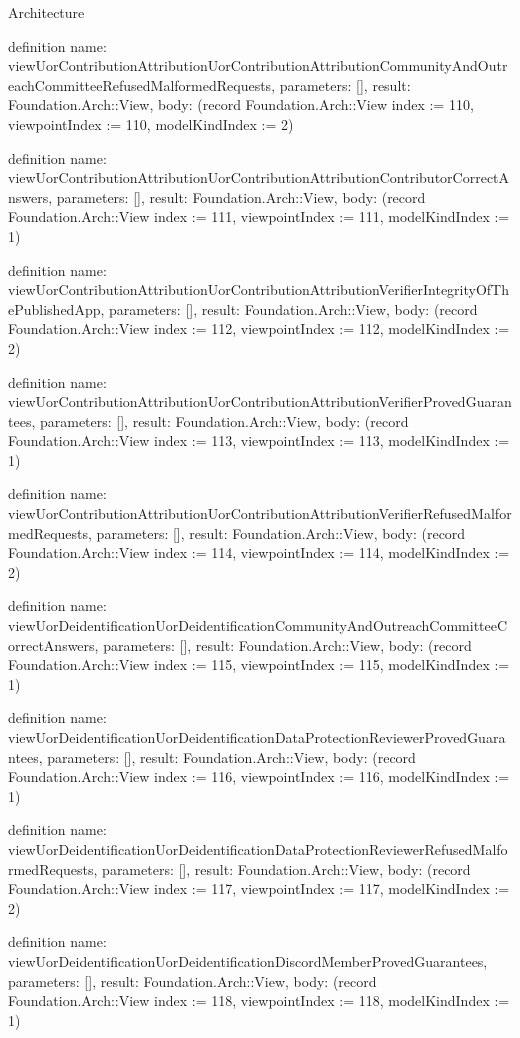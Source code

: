 \begin{lexlean}{Architecture}
\begin{semanticmodule}
definition{
  name: viewUorContributionAttributionUorContributionAttributionCommunityAndOutreachCommitteeRefusedMalformedRequests,
  parameters: [],
  result: Foundation.Arch::View,
  body: (record Foundation.Arch::View {index := 110, viewpointIndex := 110, modelKindIndex := 2})
}

definition{
  name: viewUorContributionAttributionUorContributionAttributionContributorCorrectAnswers,
  parameters: [],
  result: Foundation.Arch::View,
  body: (record Foundation.Arch::View {index := 111, viewpointIndex := 111, modelKindIndex := 1})
}

definition{
  name: viewUorContributionAttributionUorContributionAttributionVerifierIntegrityOfThePublishedApp,
  parameters: [],
  result: Foundation.Arch::View,
  body: (record Foundation.Arch::View {index := 112, viewpointIndex := 112, modelKindIndex := 2})
}

definition{
  name: viewUorContributionAttributionUorContributionAttributionVerifierProvedGuarantees,
  parameters: [],
  result: Foundation.Arch::View,
  body: (record Foundation.Arch::View {index := 113, viewpointIndex := 113, modelKindIndex := 1})
}

definition{
  name: viewUorContributionAttributionUorContributionAttributionVerifierRefusedMalformedRequests,
  parameters: [],
  result: Foundation.Arch::View,
  body: (record Foundation.Arch::View {index := 114, viewpointIndex := 114, modelKindIndex := 2})
}

definition{
  name: viewUorDeidentificationUorDeidentificationCommunityAndOutreachCommitteeCorrectAnswers,
  parameters: [],
  result: Foundation.Arch::View,
  body: (record Foundation.Arch::View {index := 115, viewpointIndex := 115, modelKindIndex := 1})
}

definition{
  name: viewUorDeidentificationUorDeidentificationDataProtectionReviewerProvedGuarantees,
  parameters: [],
  result: Foundation.Arch::View,
  body: (record Foundation.Arch::View {index := 116, viewpointIndex := 116, modelKindIndex := 1})
}

definition{
  name: viewUorDeidentificationUorDeidentificationDataProtectionReviewerRefusedMalformedRequests,
  parameters: [],
  result: Foundation.Arch::View,
  body: (record Foundation.Arch::View {index := 117, viewpointIndex := 117, modelKindIndex := 2})
}

definition{
  name: viewUorDeidentificationUorDeidentificationDiscordMemberProvedGuarantees,
  parameters: [],
  result: Foundation.Arch::View,
  body: (record Foundation.Arch::View {index := 118, viewpointIndex := 118, modelKindIndex := 1})
}


\end{semanticmodule}
\end{lexlean}
